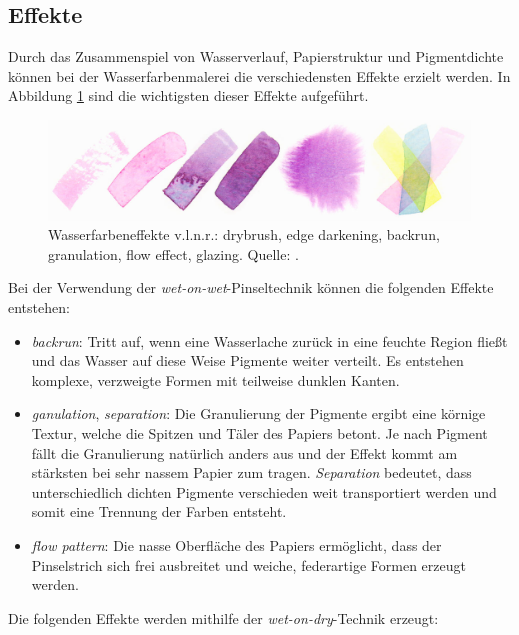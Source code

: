 \subsection{Effekte}
Durch das Zusammenspiel von Wasserverlauf, Papierstruktur und Pigmentdichte 
können bei der Wasserfarbenmalerei die verschiedensten Effekte erzielt werden. 
In Abbildung \ref{fig:effects-real} sind die wichtigsten dieser Effekte 
aufgeführt.

\begin{figure}
  \centering
  \includegraphics[width=1.00\textwidth]{../images/Curtis1997-real-watercolor-effects.eps}
  \caption{Wasserfarbeneffekte v.l.n.r.: drybrush, edge darkening, backrun,
  granulation, flow effect, glazing. Quelle: \cite{Curtis1997}.}
  \label{fig:effects-real}
\end{figure}

Bei der Verwendung der \textsl{wet-on-wet}-Pinseltechnik können die folgenden
Effekte entstehen:

\begin{itemize}
  \item \textsl{backrun}: Tritt auf, wenn eine Wasserlache zurück in eine
  feuchte Region fließt und das Wasser auf diese Weise Pigmente weiter verteilt.
  Es entstehen komplexe, verzweigte Formen mit teilweise dunklen Kanten.
  \item \textsl{ganulation}, \textsl{separation}: Die Granulierung der Pigmente
  ergibt eine körnige Textur, welche die Spitzen und Täler des Papiers betont.
  Je nach Pigment fällt die Granulierung natürlich anders aus und der Effekt
  kommt am stärksten bei sehr nassem Papier zum tragen. \textsl{Separation}
  bedeutet, dass unterschiedlich dichten Pigmente verschieden weit transportiert
  werden und somit eine Trennung der Farben entsteht.
  \item \textsl{flow pattern}: Die nasse Oberfläche des Papiers ermöglicht, dass
  der Pinselstrich sich frei ausbreitet und weiche, federartige Formen erzeugt
  werden. 
\end{itemize}

Die folgenden Effekte werden mithilfe der \textsl{wet-on-dry}-Technik erzeugt:

